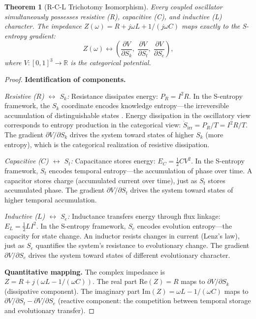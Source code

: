 \documentclass[twocolumn,10pt]{article}
\newtheorem{theorem}{Theorem}[section]
\theoremstyle{remark}
\newcommand{\Sk}{S_k}
\newcommand{\St}{S_t}
\newcommand{\Se}{S_e}
\begin{document}
\begin{theorem}[R-C-L Trichotomy Isomorphism]
\label{thm:rcl_iso}
Every coupled oscillator simultaneously possesses resistive (R), capacitive (C), and inductive (L) character.
The impedance $Z(\omega) = R + j\omega L + 1/(j\omega C)$ maps exactly to the S-entropy gradient:
\begin{equation}
Z(\omega) \longleftrightarrow \left(\frac{\partial V}{\partial \Sk},\; \frac{\partial V}{\partial \St},\; \frac{\partial V}{\partial \Se}\right),
\label{eq:rcl_map}
\end{equation}
where $V: [0,1]^3 \to \mathbb{R}$ is the categorical potential.
\end{theorem}

\begin{proof}
\textbf{Identification of components.}

\emph{Resistive ($R$) $\leftrightarrow$ $\Sk$:}
Resistance dissipates energy: $P_R = I^2 R$.
In the S-entropy framework, the $\Sk$ coordinate encodes knowledge entropy---the irreversible accumulation of distinguishable states \cite{shannon1948}.
Energy dissipation in the oscillatory view corresponds to entropy production in the categorical view: $\dot{S}_{\mathrm{irr}} = P_R / T = I^2 R / T$.
The gradient $\partial V/\partial \Sk$ drives the system toward states of higher $\Sk$ (more entropy), which is the categorical realization of resistive dissipation.

\emph{Capacitive ($C$) $\leftrightarrow$ $\St$:}
Capacitance stores energy: $E_C = \frac{1}{2}CV^2$.
In the S-entropy framework, $\St$ encodes temporal entropy---the accumulation of phase over time.
A capacitor stores charge (accumulated current over time), just as $\St$ stores accumulated phase.
The gradient $\partial V/\partial \St$ drives the system toward states of higher temporal accumulation.

\emph{Inductive ($L$) $\leftrightarrow$ $\Se$:}
Inductance transfers energy through flux linkage: $E_L = \frac{1}{2}LI^2$.
In the S-entropy framework, $\Se$ encodes evolution entropy---the capacity for state change.
An inductor resists changes in current (Lenz's law), just as $\Se$ quantifies the system's resistance to evolutionary change.
The gradient $\partial V/\partial \Se$ drives the system toward states of different evolutionary character.

\textbf{Quantitative mapping.}
The complex impedance is $Z = R + j(\omega L - 1/(\omega C))$.
The real part $\mathrm{Re}(Z) = R$ maps to $\partial V/\partial \Sk$ (dissipative component).
The imaginary part $\mathrm{Im}(Z) = \omega L - 1/(\omega C)$ maps to $\partial V/\partial \St - \partial V/\partial \Se$ (reactive component: the competition between temporal storage and evolutionary transfer).


\end{proof}
\end{document}
